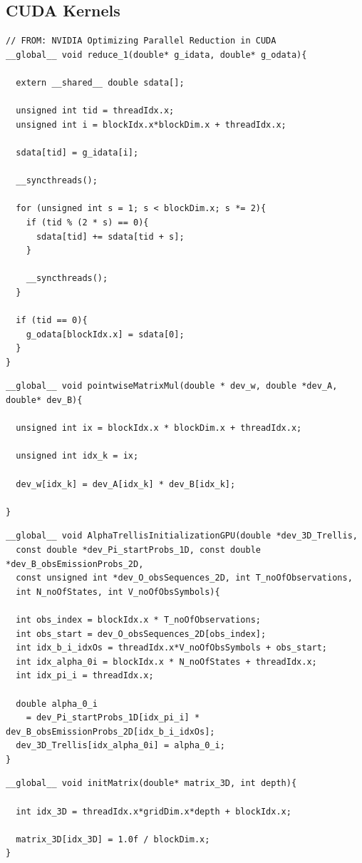 \documentclass[english, paper=a4]{scrartcl}
\begin{document}
\subsection{CUDA Kernels}

\begin{verbatim}
// FROM: NVIDIA Optimizing Parallel Reduction in CUDA
__global__ void reduce_1(double* g_idata, double* g_odata){

  extern __shared__ double sdata[];

  unsigned int tid = threadIdx.x;
  unsigned int i = blockIdx.x*blockDim.x + threadIdx.x;

  sdata[tid] = g_idata[i];

  __syncthreads();

  for (unsigned int s = 1; s < blockDim.x; s *= 2){
    if (tid % (2 * s) == 0){
      sdata[tid] += sdata[tid + s];
    }

    __syncthreads();
  }

  if (tid == 0){
    g_odata[blockIdx.x] = sdata[0];
  }
}
\end{verbatim}

\begin{verbatim}
__global__ void pointwiseMatrixMul(double * dev_w, double *dev_A, double* dev_B){

  unsigned int ix = blockIdx.x * blockDim.x + threadIdx.x;

  unsigned int idx_k = ix;

  dev_w[idx_k] = dev_A[idx_k] * dev_B[idx_k];

}
\end{verbatim}

\begin{verbatim}
__global__ void AlphaTrellisInitializationGPU(double *dev_3D_Trellis, 
  const double *dev_Pi_startProbs_1D, const double *dev_B_obsEmissionProbs_2D, 
  const unsigned int *dev_O_obsSequences_2D, int T_noOfObservations, 
  int N_noOfStates, int V_noOfObsSymbols){

  int obs_index = blockIdx.x * T_noOfObservations;
  int obs_start = dev_O_obsSequences_2D[obs_index];
  int idx_b_i_idxOs = threadIdx.x*V_noOfObsSymbols + obs_start;
  int idx_alpha_0i = blockIdx.x * N_noOfStates + threadIdx.x;
  int idx_pi_i = threadIdx.x;

  double alpha_0_i 
    = dev_Pi_startProbs_1D[idx_pi_i] * dev_B_obsEmissionProbs_2D[idx_b_i_idxOs];
  dev_3D_Trellis[idx_alpha_0i] = alpha_0_i;
}
\end{verbatim}

\begin{verbatim}
__global__ void initMatrix(double* matrix_3D, int depth){

  int idx_3D = threadIdx.x*gridDim.x*depth + blockIdx.x;

  matrix_3D[idx_3D] = 1.0f / blockDim.x;
}
\end{verbatim}
\end{document}
